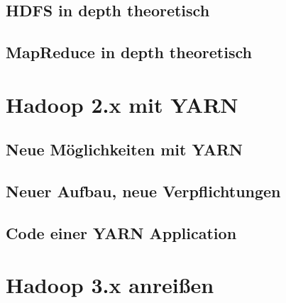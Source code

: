 \subsection{HDFS in depth theoretisch}
\subsection{MapReduce in depth theoretisch}

\section{Hadoop 2.x mit YARN}
\subsection{Neue Möglichkeiten mit YARN}
\subsection{Neuer Aufbau, neue Verpflichtungen}
\subsection{Code einer YARN Application}

\section{Hadoop 3.x anreißen}